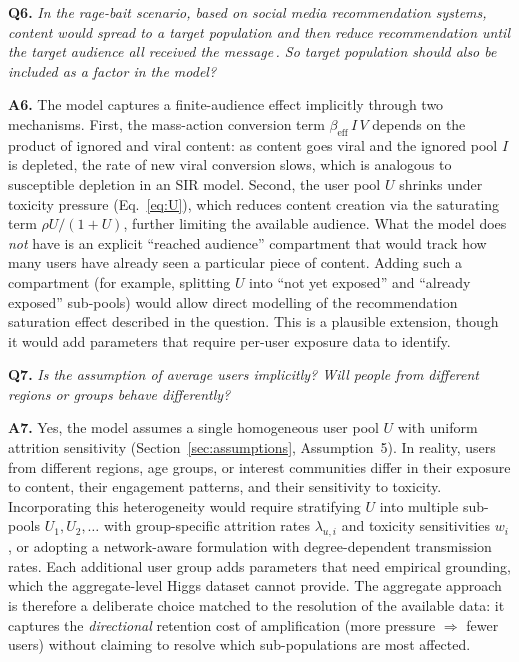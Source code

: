 \documentclass[11pt]{article}
\begin{document}
\bigskip

\noindent\textbf{Q6.} \textit{In the rage-bait scenario, based on social media recommendation systems, content would spread to a target population and then reduce recommendation until the target audience all received the message\,. So target population should also be included as a factor in the model?}

\medskip
\noindent\textbf{A6.}
The model captures a finite-audience effect implicitly through two mechanisms.
First, the mass-action conversion term $\beta_{\mathrm{eff}}\,I\,V$ depends on the product of ignored and viral content: as content goes viral and the ignored pool $I$ is depleted, the rate of new viral conversion slows, which is analogous to susceptible depletion in an SIR model.
Second, the user pool $U$ shrinks under toxicity pressure (Eq.~\ref{eq:U}), which reduces content creation via the saturating term $\rho U/(1+U)$, further limiting the available audience.
What the model does \emph{not} have is an explicit ``reached audience'' compartment that would track how many users have already seen a particular piece of content.
Adding such a compartment (for example, splitting $U$ into ``not yet exposed'' and ``already exposed'' sub-pools) would allow direct modelling of the recommendation saturation effect described in the question. This is a plausible extension, though it would add parameters that require per-user exposure data to identify.

\bigskip

\noindent\textbf{Q7.} \textit{Is the assumption of average users implicitly? Will people from different regions or groups behave differently?}

\medskip
\noindent\textbf{A7.}
Yes, the model assumes a single homogeneous user pool $U$ with uniform attrition sensitivity (Section~\ref{sec:assumptions}, Assumption~5).
In reality, users from different regions, age groups, or interest communities differ in their exposure to content, their engagement patterns, and their sensitivity to toxicity.
Incorporating this heterogeneity would require stratifying $U$ into multiple sub-pools $U_1, U_2, \ldots$ with group-specific attrition rates $\lambda_{u,i}$ and toxicity sensitivities $w_i$, or adopting a network-aware formulation with degree-dependent transmission rates.
Each additional user group adds parameters that need empirical grounding, which the aggregate-level Higgs dataset cannot provide.
The aggregate approach is therefore a deliberate choice matched to the resolution of the available data: it captures the \emph{directional} retention cost of amplification (more pressure $\Rightarrow$ fewer users) without claiming to resolve which sub-populations are most affected.
\end{document}
